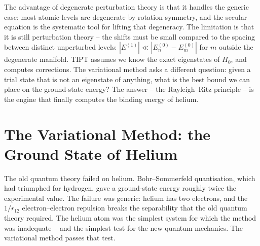 The advantage of degenerate perturbation theory is that it handles the generic case: most atomic levels are degenerate by rotation symmetry, and the secular equation is the systematic tool for lifting that degeneracy. The limitation is that it is still perturbation theory -- the shifts must be small compared to the spacing between distinct unperturbed levels: $|E^{(1)}| \ll |E_{n}^{(0)}-E_{m}^{(0)}|$ for $m$ outside the degenerate manifold. TIPT assumes we know the exact eigenstates of $H_{0}$, and computes corrections. The variational method asks a different question: given a trial state that is not an eigenstate of anything, what is the best bound we can place on the ground-state energy? The answer -- the Rayleigh--Ritz principle -- is the engine that finally computes the binding energy of helium.

\section{The Variational Method: the Ground State of Helium}
\label{sec:variational-method}

The old quantum theory failed on helium. Bohr--Sommerfeld quantisation, which had triumphed for hydrogen, gave a ground-state energy roughly twice the experimental value. The failure was generic: helium has two electrons, and the $1/r_{12}$ electron--electron repulsion breaks the separability that the old quantum theory required. The helium atom was the simplest system for which the method was inadequate -- and the simplest test for the new quantum mechanics. The variational method passes that test.

